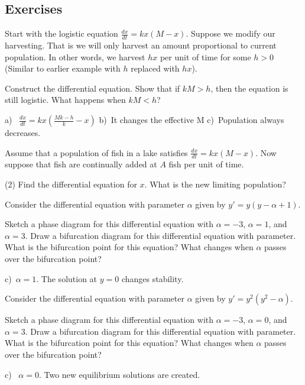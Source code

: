 \subsection{Exercises}

\begin{exercise}
Start with the logistic equation
$\frac{dx}{dt} = kx(M-x)$.
Suppose we modify our harvesting.  That is we will only harvest 
an amount proportional to current population.  In other words, we harvest $hx$
per unit of time
for some $h > 0$ (Similar to earlier example with $h$ replaced with $hx$).
\begin{tasks}
\task Construct the differential equation. 
\task Show that if $kM > h$, then
the equation is still logistic.
\task What happens when $kM < h$?
\end{tasks}
\end{exercise}
\comboSol{%
}
{%
a)~ $\frac{dx}{dt} = kx\left(\frac{Mk-h}{k} - x\right)$ \quad b)~It changes the effective M \quad c)~Population always decreases.
}

\begin{exercise}\ansMark
Assume that a population of fish in a lake satisfies
$\frac{dx}{dt} = kx(M-x)$.  Now suppose that fish are continually added
at $A$ fish per unit of time.
\begin{tasks}(2)
\task Find the differential equation for $x$.
\task What is the new limiting population?
\end{tasks}
\end{exercise}

\begin{exercise}
Consider the differential equation with parameter $\alpha$ given by $y' = y(y - \alpha + 1)$. 
\begin{tasks}
\task Sketch a phase diagram for this differential equation with $\alpha = -3$, $\alpha = 1$, and $\alpha = 3$. 
\task Draw a bifurcation diagram for this differential equation with parameter. 
\task What is the bifurcation point for this equation? What changes when $\alpha$ passes over the bifurcation point?
\end{tasks}
\end{exercise}
\comboSol{%
}
{%
c)~$\alpha = 1$. The solution at $y=0$ changes stability.
}

\begin{exercise}
Consider the differential equation with parameter $\alpha$ given by $y' = y^2(y^2 - \alpha)$. 
\begin{tasks}
\task Sketch a phase diagram for this differential equation with $\alpha = -3$, $\alpha = 0$, and $\alpha = 3$. 
\task Draw a bifurcation diagram for this differential equation with parameter. 
\task What is the bifurcation point for this equation? What changes when $\alpha$ passes over the bifurcation point?
\end{tasks}
\end{exercise}
\comboSol{%
}
{%
c)~ $\alpha = 0$. Two new equilibrium solutions are created. 
}

